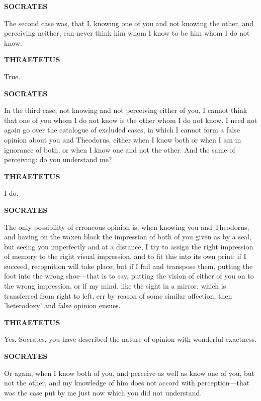 \documentclass[11pt,letter]{article}
\begin{document}
\par \textbf{SOCRATES}
\par   The second case was, that I, knowing one of you and not knowing the other, and perceiving neither, can never think him whom I know to be him whom I do not know.

\par \textbf{THEAETETUS}
\par   True.

\par \textbf{SOCRATES}
\par   In the third case, not knowing and not perceiving either of you, I cannot think that one of you whom I do not know is the other whom I do not know. I need not again go over the catalogue of excluded cases, in which I cannot form a false opinion about you and Theodorus, either when I know both or when I am in ignorance of both, or when I know one and not the other. And the same of perceiving:  do you understand me?

\par \textbf{THEAETETUS}
\par   I do.

\par \textbf{SOCRATES}
\par   The only possibility of erroneous opinion is, when knowing you and Theodorus, and having on the waxen block the impression of both of you given as by a seal, but seeing you imperfectly and at a distance, I try to assign the right impression of memory to the right visual impression, and to fit this into its own print:  if I succeed, recognition will take place; but if I fail and transpose them, putting the foot into the wrong shoe—that is to say, putting the vision of either of you on to the wrong impression, or if my mind, like the sight in a mirror, which is transferred from right to left, err by reason of some similar affection, then 'heterodoxy' and false opinion ensues.

\par \textbf{THEAETETUS}
\par   Yes, Socrates, you have described the nature of opinion with wonderful exactness.

\par \textbf{SOCRATES}
\par   Or again, when I know both of you, and perceive as well as know one of you, but not the other, and my knowledge of him does not accord with perception—that was the case put by me just now which you did not understand.
\end{document}
